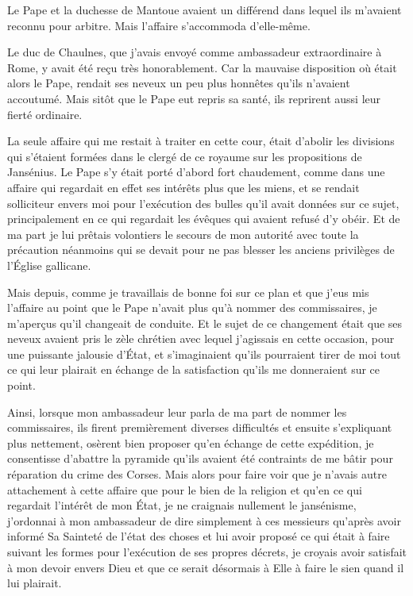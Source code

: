 \documentclass[french,twoside]{book} %
\begin{document}
Le Pape et la duchesse de Mantoue avaient un différend dans lequel ils m’avaient reconnu pour arbitre. Mais l’affaire s’accommoda d’elle-même.\par
Le duc de Chaulnes, que j’avais envoyé comme ambassadeur extraordinaire à Rome, y avait été reçu très honorablement. Car la mauvaise disposition où était alors le Pape, rendait ses neveux un peu plus honnêtes qu’ils n’avaient accoutumé. Mais sitôt que le Pape eut repris sa santé, ils reprirent aussi leur fierté ordinaire.\par
La seule affaire qui me restait à traiter en cette cour, était d’abolir les divisions qui s’étaient formées dans le clergé de ce royaume sur les propositions de Jansénius. Le Pape s’y était porté d’abord fort chaudement, comme dans une affaire qui regardait en effet ses intérêts plus que les miens, et se rendait solliciteur envers moi pour l’exécution des bulles qu’il avait données sur ce sujet, principalement en ce qui regardait les évêques qui avaient refusé d’y obéir. Et de ma part je lui prêtais volontiers le secours de mon autorité avec toute la précaution néanmoins qui se devait pour ne pas blesser les anciens privilèges de l’Église gallicane.\par
Mais depuis, comme je travaillais de bonne foi sur ce plan et que j’eus mis l’affaire au point que le Pape n’avait plus qu’à nommer des commissaires, je m’aperçus qu’il changeait de conduite. Et le sujet de ce changement était que ses neveux avaient pris le zèle chrétien avec lequel j’agissais en cette occasion, pour une puissante jalousie d’État, et s’imaginaient qu’ils pourraient tirer de moi tout ce qui leur plairait en échange de la satisfaction qu’ils me donneraient sur ce point.\par
Ainsi, lorsque mon ambassadeur leur parla de ma part de nommer les commissaires, ils firent premièrement diverses difficultés et ensuite s’expliquant plus nettement, osèrent bien proposer qu’en échange de cette expédition, je consentisse d’abattre la pyramide qu’ils avaient été contraints de me bâtir pour réparation du crime des Corses. Mais alors pour faire voir que je n’avais autre attachement à cette affaire que pour le bien de la religion et qu’en ce qui regardait l’intérêt de mon État, je ne craignais nullement le jansénisme, j’ordonnai à mon ambassadeur de dire simplement à ces messieurs qu’après avoir informé Sa Sainteté de l’état des choses et lui avoir proposé ce qui était à faire suivant les formes pour l’exécution de ses propres décrets, je croyais avoir satisfait à mon devoir envers Dieu et que ce serait désormais à Elle à faire le sien quand il lui plairait.\par
\end{document}
